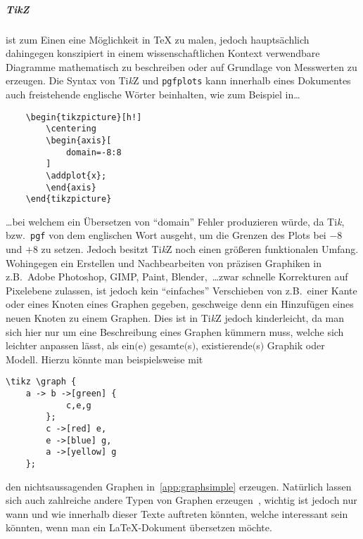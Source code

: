 \subparagraph*{Ti\textit{k}Z} ist zum Einen eine Möglichkeit in \TeX{} zu malen, jedoch hauptsächlich dahingegen konszipiert in einem wissenschaftlichen Kontext verwendbare Diagramme mathematisch zu beschreiben oder auf Grundlage von Messwerten zu erzeugen. Die Syntax von Ti\textit{k}Z und \texttt{pgfplots} kann innerhalb eines Dokumentes auch freistehende englische Wörter beinhalten, wie zum Beispiel in\ldots
\begin{verbatim}
    \begin{tikzpicture}[h!]
        \centering
        \begin{axis}[
            domain=-8:8
        ]
        \addplot{x};
        \end{axis}
    \end{tikzpicture}
\end{verbatim}
\ldots bei welchem ein Übersetzen von \enquote{domain} Fehler produzieren würde, da Ti\textit{k}, bzw.\ \texttt{pgf} von dem englischen Wort ausgeht, um die Grenzen des Plots bei $-8$ und $+8$ zu setzen. Jedoch besitzt Ti\textit{k}Z noch einen größeren funktionalen Umfang. Wohingegen ein Erstellen und Nachbearbeiten von präzisen Graphiken in z.B.\ Adobe Photoshop, GIMP, Paint, Blender,~\ldots zwar schnelle Korrekturen auf Pixelebene zulassen, ist jedoch kein \enquote{einfaches} Verschieben von z.B.\ einer Kante oder eines Knoten eines Graphen gegeben, geschweige denn ein Hinzufügen eines neuen Knoten zu einem Graphen. Dies ist in Ti\textit{k}Z jedoch kinderleicht, da man sich hier nur um eine Beschreibung eines Graphen kümmern muss, welche sich leichter anpassen lässt, als ein$($e$)$ gesamte$($s$)$, existierende$($s$)$ Graphik oder Modell. Hierzu könnte man beispielsweise mit
\begin{Verbatim}[breaklines=true, breakanywhere=true]
    \tikz \graph {
    a -> b ->[green] {
            c,e,g
        };
        c ->[red] e,
        e ->[blue] g,
        a ->[yellow] g
    };
\end{Verbatim}
den nichtsaussagenden Graphen in~\ref{app:graphsimple} erzeugen. Natürlich lassen sich auch zahlreiche andere Typen von Graphen erzeugen~\citep{pgf:tillTantau:tikz}, wichtig ist jedoch nur wann und wie innerhalb dieser Texte auftreten könnten, welche interessant sein könnten, wenn man ein \LaTeX{}-Dokument übersetzen möchte.

